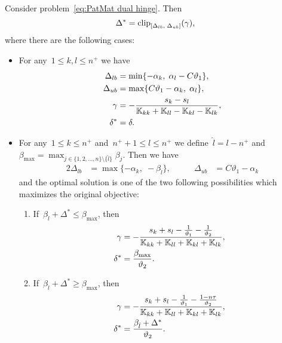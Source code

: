 \begin{theorem}\label{thm:Update rule PatMat with hinge loss}
  Consider problem~\eqref{eq:PatMat dual hinge}. Then
  \begin{equation*}
      \Delta^{*} = \clip{\Delta_{lb}}{\Delta_{ub}}{\gamma},
  \end{equation*}
  where there are the following cases:
  \begin{itemize}
    \item For any~$1\le k, l \le n^+$ we have
    \begin{align*}
      \Delta_{lb} & = \min\{- \alpha_k,\; \alpha_l - C \vartheta_1\}, \\
      \Delta_{ub} & = \max\{C \vartheta_1 - \alpha_k,\; \alpha_l\}, \\
      \gamma      & = -\frac{s_k - s_l}{\mathbb{K}_{kk} + \mathbb{K}_{ll} - \mathbb{K}_{kl} - \mathbb{K}_{lk}}, \\
      \delta^{*}  & = \delta.
    \end{align*}

    \item For any~$1 \le k \le n^+$ and~$n^+ + 1 \le l \le n^+$ we define~$\hat{l} = l - n^+$ and~$\beta_{\max} = \max_{j \in \{1, 2, \ldots, n\} \setminus \{\hat l\}} \beta_j.$ Then we have
    \begin{alignat*}{2}
      \Delta_{lb} & = \max\{- \alpha_k,\; -\beta_{\hat{l}} \}, & \qquad
      \Delta_{ub} & = C \vartheta_1 - \alpha_k
    \end{alignat*}
    and the optimal solution is one of the two following possibilities which maximizes the original objective:
    \begin{enumerate}
      \item If~$\beta_{\hat{l}} + \Delta^{*} \leq \beta_{\max}$, then
      \begin{align*}
        \gamma & = -\frac{s_k + s_l - \frac{1}{\vartheta_1} - \frac{1}{\vartheta_2}}{\mathbb{K}_{kk} + \mathbb{K}_{ll} + \mathbb{K}_{kl} + \mathbb{K}_{lk}}, \\
        \delta^{*} & = \frac{\beta_{\max}}{\vartheta_2}.
      \end{align*}
      \item If~$\beta_{\hat{l}} + \Delta^{*} \ge \beta_{\max}$, then
      \begin{align*}
        \gamma & = -\frac{s_k + s_l - \frac{1}{\vartheta_1} - \frac{1 - n\tau}{\vartheta_2}}{\mathbb{K}_{kk} + \mathbb{K}_{ll} + \mathbb{K}_{kl} + \mathbb{K}_{lk}}, \\
        \delta^{*} & = \frac{\beta_{\hat{l}} + \Delta^{*}}{\vartheta_2}.
      \end{align*}
    \end{enumerate}


\end{itemize}
\end{theorem}
